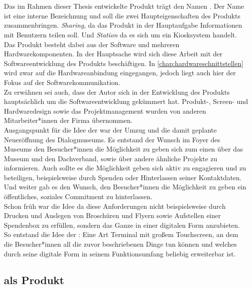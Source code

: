 \section{\shst{}}
\label{sec:sharing-station}

Das im Rahmen dieser Thesis entwickelte Produkt trägt den Namen \shst{}. Der Name 
ist eine interne Bezeichnung und soll die zwei Haupteigenschaften des Produkts zusammenbringen.
\emph{Sharing}, da das Produkt in der Hauptaufgabe Informationen mit Benutzern teilen soll. 
Und \emph{Station} da es sich um ein Kiosksystem handelt.\\

Das Produkt besteht dabei aus der Software und mehreren Hardwarekomponenten. In der Hauptsache
wird sich diese Arbeit mit der Softwareentwicklung des Produkts beschäftigen. In \autoref{chap:hardwareschnittstellen} 
wird zwar auf die Hardwareanbindung eingegangen, jedoch liegt auch hier der Fokus auf der Softwarekommunikation.\\
Zu erwähnen sei auch, dass der Autor sich in der Entwicklung des Produkts hauptsächlich um die Softwareentwicklung 
gekümmert hat. Produkt-, Screen- und Hardwaredesign sowie das Projektmanagement wurden von anderen Mitarbeiter*innen
der Firma \meso{} übernommen.\\

Ausgangspunkt für die Idee der \shst{} war der Umzug und die damit geplante Neueröffnung des Dialogmuseums.
Es entstand der Wunsch im Foyer des Museums den Besucher*innen die Möglichkeit zu geben sich zum einen 
über das Museum und den Dachverband, sowie über andere ähnliche Projekte zu informieren. Auch sollte
es die Möglichkeit geben sich aktiv zu engagieren und zu beteiligen, beispielsweise durch Spenden oder 
Hinterlassen seiner Kontaktdaten. Und weiter gab es den Wunsch, den Besucher*innen die Möglichkeit zu geben ein 
öffentliches, soziales Commitment zu hinterlassen.\\
Schon früh war die Idee da diese Anforderungen nicht beispielsweise durch Drucken und Auslegen von 
Broschüren und Flyern sowie Aufstellen einer Spendenbox zu erfüllen, sondern das Ganze in einer digitalen
Form anzubieten. So entstand die Idee der \shst{}: Eine Art Terminal mit großem Touchscreen, an dem die Besucher*innen 
all die zuvor beschriebenen Dinge tun können und welches durch seine digitale Form in seinem Funktionsumfang
beliebig erweiterbar ist.

\subsection{\shst{} als Produkt}
\label{subs:sharing-station-produkt}

